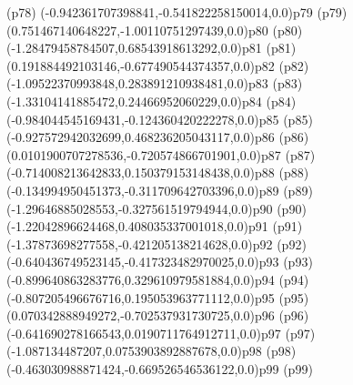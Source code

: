 \psdot(p78)
\psPoint(-0.942361707398841,-0.541822258150014,0.0){p79}
\psdot(p79)
\psPoint(0.751467140648227,-1.00110751297439,0.0){p80}
\psdot(p80)
\psPoint(-1.28479458784507,0.68543918613292,0.0){p81}
\psdot(p81)
\psPoint(0.191884492103146,-0.677490544374357,0.0){p82}
\psdot(p82)
\psPoint(-1.09522370993848,0.283891210938481,0.0){p83}
\psdot(p83)
\psPoint(-1.33104141885472,0.24466952060229,0.0){p84}
\psdot(p84)
\psPoint(-0.984044545169431,-0.124360420222278,0.0){p85}
\psdot(p85)
\psPoint(-0.927572942032699,0.468236205043117,0.0){p86}
\psdot(p86)
\psPoint(0.0101900707278536,-0.720574866701901,0.0){p87}
\psdot(p87)
\psPoint(-0.714008213642833,0.150379153148438,0.0){p88}
\psdot(p88)
\psPoint(-0.134994950451373,-0.311709642703396,0.0){p89}
\psdot(p89)
\psPoint(-1.29646885028553,-0.327561519794944,0.0){p90}
\psdot(p90)
\psPoint(-1.22042896624468,0.408035337001018,0.0){p91}
\psdot(p91)
\psPoint(-1.37873698277558,-0.421205138214628,0.0){p92}
\psdot(p92)
\psPoint(-0.640436749523145,-0.417323482970025,0.0){p93}
\psdot(p93)
\psPoint(-0.899640863283776,0.329610979581884,0.0){p94}
\psdot(p94)
\psPoint(-0.807205496676716,0.195053963771112,0.0){p95}
\psdot(p95)
\psPoint(0.070342888949272,-0.702537931730725,0.0){p96}
\psdot(p96)
\psPoint(-0.641690278166543,0.0190711764912711,0.0){p97}
\psdot(p97)
\psPoint(-1.087134487207,0.0753903892887678,0.0){p98}
\psdot(p98)
\psPoint(-0.463030988871424,-0.669526546536122,0.0){p99}
\psdot(p99)
